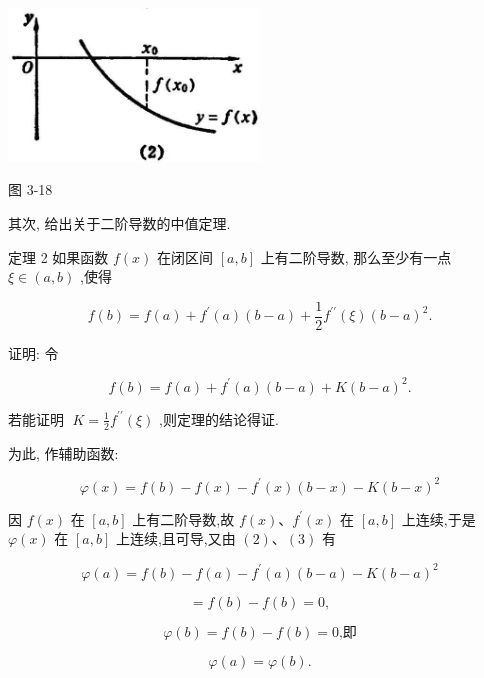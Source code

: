 \documentclass[10pt]{article}
\begin{document}
\begin{center}
\includegraphics[max width=0.5\textwidth]{images/01912c18-5c3f-733d-b775-749ba9897a9d_160_221128.jpg}
\end{center}

图 3-18

其次, 给出关于二阶导数的中值定理.

定理 2 如果函数 \(f\left( x\right)\) 在闭区间 \(\left\lbrack {a,b}\right\rbrack\) 上有二阶导数, 那么至少有一点 \(\xi \in \left( {a,b}\right)\) ,使得

\[
f\left( b\right) = f\left( a\right) + {f}^{\prime }\left( a\right) \left( {b - a}\right) + \frac{1}{2}{f}^{\prime \prime }\left( \xi \right) {\left( b - a\right) }^{2}. \tag{1}
\]

证明: 令

\[
f\left( b\right) = f\left( a\right) + {f}^{\prime }\left( a\right) \left( {b - a}\right) + K{\left( b - a\right) }^{2}. \tag{2}
\]

若能证明 \(\;K = \frac{1}{2}{f}^{\prime \prime }\left( \xi \right)\) ,则定理的结论得证.

为此, 作辅助函数:

\[
\varphi \left( x\right) = f\left( b\right) - f\left( x\right) - {f}^{\prime }\left( x\right) \left( {b - x}\right) - K{\left( b - x\right) }^{2} \tag{3}
\]

因 \(f\left( x\right)\) 在 \(\left\lbrack {a,b}\right\rbrack\) 上有二阶导数,故 \(f\left( x\right) \text{、}{f}^{\prime }\left( x\right)\) 在 \(\left\lbrack {a,b}\right\rbrack\) 上连续,于是 \(\varphi \left( x\right)\) 在 \(\left\lbrack {a,b}\right\rbrack\) 上连续,且可导,又由 \(\left( 2\right) \text{、}\left( 3\right)\) 有

\[
\varphi \left( a\right) = f\left( b\right) - f\left( a\right) - {f}^{\prime }\left( a\right) \left( {b - a}\right) - K{\left( b - a\right) }^{2}
\]

\[
= f\left( b\right) - f\left( b\right) = 0,
\]

\[
\varphi \left( b\right) = f\left( b\right) - f\left( b\right) = 0\text{,即}
\]

\[
\varphi \left( a\right) = \varphi \left( b\right) \text{.}
\]
\end{document}
